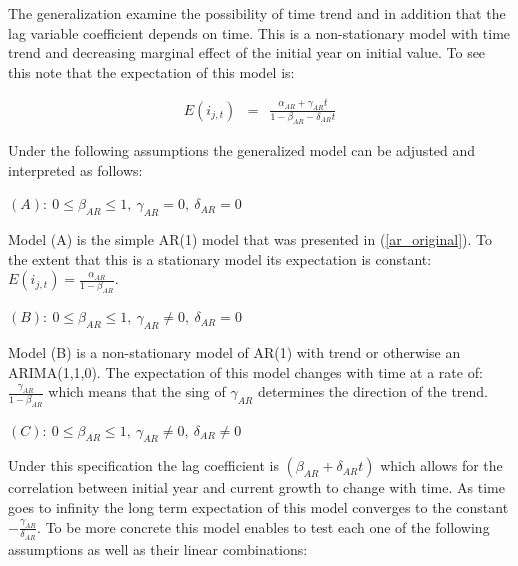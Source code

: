 \documentclass[]{amsart}
\begin{document}
\bigskip

The generalization examine the possibility of time trend and in addition that the lag variable coefficient depends on time. This is a non-stationary model with time trend and decreasing marginal effect of the initial year on initial value. To see this note that the expectation of this model is:

\bigskip

\begin{eqnarray}
E (i_{j,t}) & = & \frac{\alpha_{AR} + \gamma_{AR} t}{1 - \beta_{AR} - \delta_{AR}t}
\end{eqnarray}

\bigskip
 
Under the following assumptions the generalized model can be adjusted and interpreted as follows:

\bigskip

$(A): \  0 \leq \beta_{AR} \leq 1, \ \gamma_{AR} = 0, \ \delta_{AR} = 0  \ \  $

\bigskip

Model (A) is the simple AR(1) model that was presented in (\ref{ar_original}). To the extent that this is a stationary model its expectation is constant: $E (i_{j,t}) =  \frac{\alpha_{AR}}{1 - \beta_{AR} }$.

\bigskip
 
$(B): \  0 \leq \beta_{AR} \leq 1, \ \gamma_{AR} \neq 0, \ \delta_{AR} = 0  \ \  $

\bigskip

Model (B) is a non-stationary model of AR(1) with trend or otherwise an ARIMA(1,1,0). The expectation of this model changes with time at a rate of: $\frac{\gamma_{AR}}{1 - \beta_{AR}}$ which means that the sing of $\gamma_{AR}$ determines the direction of the trend. 

\bigskip

$(C): \ 0 \leq \beta_{AR} \leq 1, \ \gamma_{AR} \neq 0, \ \delta_{AR} \neq 0  \ \  $

\bigskip

Under this specification the lag coefficient is $(\beta_{AR}+\delta_{AR} t)$ which allows for the correlation between initial year and current growth to change with time. As time goes to infinity the long term expectation of this model converges to the constant $-\frac{\gamma_{AR}}{\delta_{AR}}$. To be more concrete this model enables to test each one of the following assumptions as well as their linear combinations: 

\bigskip
\end{document}

